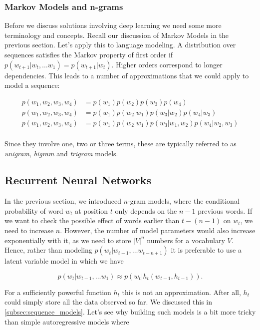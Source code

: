 \subsubsection{Markov Models and n-grams}

Before we discuss solutions involving deep learning we need some more terminology and concepts. Recall our discussion of Markov Models in the previous section. Let’s apply this to language modeling. A distribution over sequences satisfies the Markov property of first order if $p(w_{t+1}|w_t, \ldots w_1) = p(w_{t+1}|w_t)$. Higher orders correspond to longer dependencies. This leads to a number of approximations that we could apply to model a sequence:

$$
\begin{aligned}
p(w_1, w_2, w_3, w_4) &=  p(w_1) p(w_2) p(w_3) p(w_4)\\
p(w_1, w_2, w_3, w_4) &=  p(w_1) p(w_2 | w_1) p(w_3 | w_2) p(w_4 | w_3)\\
p(w_1, w_2, w_3, w_4) &=  p(w_1) p(w_2 | w_1) p(w_3 | w_1, w_2) p(w_4 | w_2, w_3)\\
\end{aligned}
$$

Since they involve one, two or three terms, these are typically referred to as \textit{unigram}, \textit{bigram} and \textit{trigram} models. 

\subsection{Recurrent Neural Networks}\label{subsec:rnn}

In the previous section, we introduced $n$-gram models, where the conditional probability of word $w_t$ at position $t$ only depends on the $n-1$ previous words. If we want to check the possible effect of words earlier than $t-(n-1)$ on $w_t$, we need to increase $n$. However, the number of model parameters would also increase exponentially with it, as we need to store $|V|^n$ numbers for a vocabulary $V$. Hence, rather than modeling $p(w_t|w_{t-1}, \ldots w_{t-n+1})$ it is preferable to use a latent variable model in which we have

$$p(w_t|w_{t-1}, \ldots w_1) \approx p(w_t|h_t(w_{t-1}, h_{t-1})).$$

For a sufficiently powerful function $h_t$ this is not an approximation. After all, $h_t$ could simply store all the data observed so far. We discussed this in \cref{subsec:sequence_models}. Let's see why building such models is a bit more tricky than simple autoregressive models where

